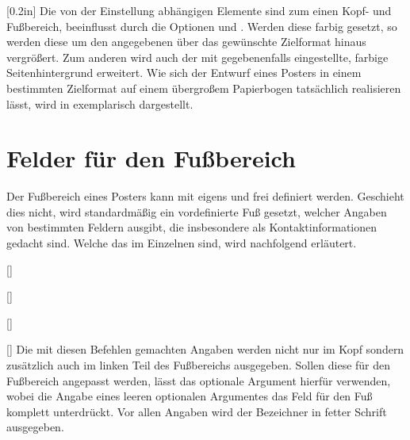 \begin{Bundle*}[v2.05]{}
\begin{Declaration}{}[0.2in]
Die von der Einstellung  abhängigen 
Elemente sind zum einen Kopf- und Fußbereich, beeinflusst durch die Optionen 
 und . Werden diese farbig gesetzt, so werden 
diese um den angegebenen  über das gewünschte Zielformat 
hinaus vergrößert. Zum anderen wird auch der mit  
gegebenenfalls eingestellte, farbige Seitenhintergrund erweitert. Wie sich der 
Entwurf eines Posters in einem bestimmten Zielformat auf einem übergroßem 
Papierbogen tatsächlich realisieren lässt, wird in  
exemplarisch dargestellt.
\end{Declaration}



\section{Felder für den Fußbereich}
%
%
Der Fußbereich eines Posters kann mit  eigens und frei 
definiert werden. Geschieht dies nicht, wird standardmäßig ein vordefinierte 
Fuß gesetzt, welcher Angaben von bestimmten Feldern ausgibt, die insbesondere 
als Kontaktinformationen gedacht sind. Welche das im Einzelnen sind, wird 
nachfolgend erläutert.

\begin{Declaration}{%
  []%
}
\begin{Declaration}{%
  []%
}
\begin{Declaration}{%
  []%
}
\begin{Declaration}{%
  []%
}
\printdeclarationlist%
%
Die mit diesen Befehlen gemachten Angaben werden nicht nur im Kopf sondern 
zusätzlich auch im linken Teil des Fußbereichs ausgegeben. Sollen diese für den 
Fußbereich angepasst werden, lässt das optionale Argument hierfür verwenden, 
wobei die Angabe eines leeren optionalen Argumentes das Feld für den Fuß 
komplett unterdrückt. Vor allen Angaben wird der Bezeichner  
in fetter Schrift ausgegeben.
\end{Declaration}
\end{Declaration}
\end{Declaration}
\end{Declaration}



\end{Bundle*}
